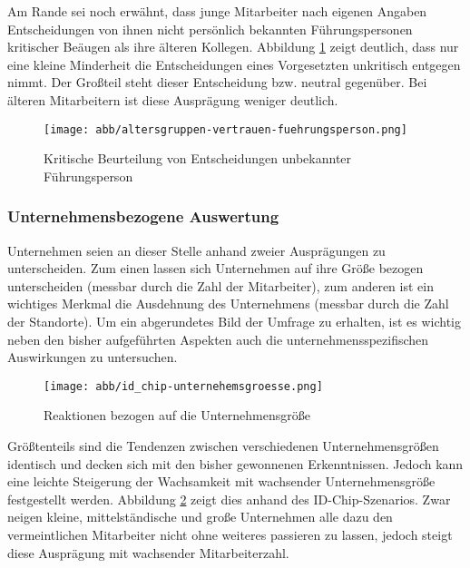 Am Rande sei noch erwähnt, dass junge Mitarbeiter nach eigenen Angaben Entscheidungen von ihnen nicht persönlich bekannten Führungspersonen kritischer Beäugen als ihre älteren Kollegen.
Abbildung \ref{fig:kritische-beurteilung} zeigt deutlich, dass nur eine kleine Minderheit die Entscheidungen eines Vorgesetzten unkritisch entgegen nimmt.
Der Großteil steht dieser Entscheidung bzw. neutral gegenüber.
Bei älteren Mitarbeitern ist diese Ausprägung weniger deutlich.

\begin{figure}[htbp]
	\centering
	\texttt{[image: abb/altersgruppen-vertrauen-fuehrungsperson.png]}
	\caption{Kritische Beurteilung von Entscheidungen unbekannter Führungsperson}
	\label{fig:kritische-beurteilung}
\end{figure}

\subsubsection{Unternehmensbezogene Auswertung}\label{sec:unternehmensbezogene-auswertung}

Unternehmen seien an dieser Stelle anhand zweier Ausprägungen zu unterscheiden.
Zum einen lassen sich Unternehmen auf ihre Größe bezogen unterscheiden (messbar durch die Zahl der Mitarbeiter), zum anderen ist ein wichtiges Merkmal die Ausdehnung des Unternehmens (messbar durch die Zahl der Standorte).
Um ein abgerundetes Bild der Umfrage zu erhalten, ist es wichtig neben den bisher aufgeführten Aspekten auch die unternehmensspezifischen Auswirkungen zu untersuchen.

\begin{figure}[htbp]
	\centering
	\texttt{[image: abb/id\_chip-unternehemsgroesse.png]}
	\caption{Reaktionen bezogen auf die Unternehmensgröße}
	\label{fig:id-chip-unternehmensgroesse}
\end{figure}

Größtenteils sind die Tendenzen zwischen verschiedenen Unternehmensgrößen identisch und decken sich mit den bisher gewonnenen Erkenntnissen.
Jedoch kann eine leichte Steigerung der Wachsamkeit mit wachsender Unternehmensgröße festgestellt werden.
Abbildung \ref{fig:id-chip-unternehmensgroesse} zeigt dies anhand des ID-Chip-Szenarios.
Zwar neigen kleine, mittelständische und große Unternehmen alle dazu den vermeintlichen Mitarbeiter nicht ohne weiteres passieren zu lassen, jedoch steigt diese Ausprägung mit wachsender Mitarbeiterzahl.

